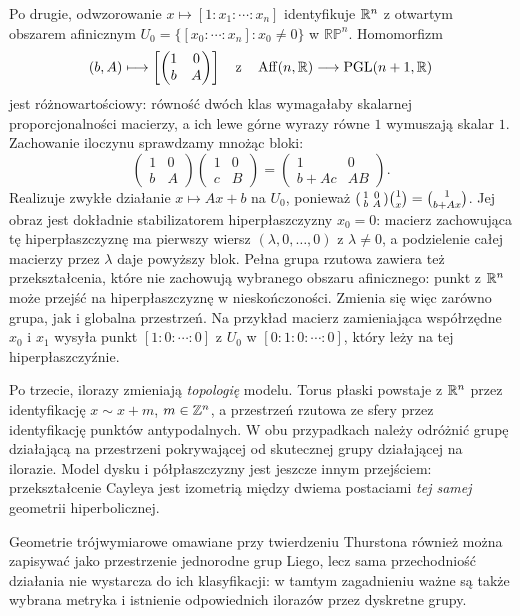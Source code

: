 Po drugie, odwzorowanie $x\mapsto[1:x_1:\cdots:x_n]$
identyfikuje $\mathbb{R}^n$ z otwartym obszarem afinicznym
$U_0=\{[x_0:\cdots:x_n]:x_0\ne0\}$ w $\mathbb{RP}^n$.
Homomorfizm
\[
 (b,A)\longmapsto
 \left[\begin{pmatrix}1&0\\b&A\end{pmatrix}\right]
 \quad\text{z}\quad
 \operatorname{Aff}(n,\mathbb{R})
 \longrightarrow\mathrm{PGL}(n+1,\mathbb{R})
\]
jest różnowartościowy: równość dwóch klas wymagałaby
skalarnej proporcjonalności macierzy, a ich lewe górne
wyrazy równe $1$ wymuszają skalar $1$.
Zachowanie iloczynu sprawdzamy mnożąc bloki:
\[
 \begin{pmatrix}1&0\\b&A\end{pmatrix}
 \begin{pmatrix}1&0\\c&B\end{pmatrix}
 =\begin{pmatrix}1&0\\b+Ac&AB\end{pmatrix}.
\]
Realizuje zwykłe działanie
$x\mapsto Ax+b$ na $U_0$, ponieważ
$\begin{psmallmatrix}1&0\\b&A\end{psmallmatrix}
\binom{1}{x}=\binom{1}{b+Ax}$.
Jej obraz jest dokładnie stabilizatorem hiperpłaszczyzny
$x_0=0$: macierz zachowująca tę hiperpłaszczyznę ma
pierwszy wiersz $(\lambda,0,\ldots,0)$ z $\lambda\ne0$,
a podzielenie całej macierzy przez $\lambda$ daje powyższy blok.
Pełna grupa rzutowa
zawiera też przekształcenia, które nie zachowują
wybranego obszaru afinicznego: punkt z $\mathbb{R}^n$ może przejść
na hiperpłaszczyznę w nieskończoności. Zmienia się więc
zarówno grupa, jak i globalna przestrzeń.
Na przykład macierz zamieniająca współrzędne $x_0$ i $x_1$
wysyła punkt $[1:0:\cdots:0]$ z $U_0$ w
$[0:1:0:\cdots:0]$, który leży na tej hiperpłaszczyźnie.

Po trzecie, ilorazy zmieniają \emph{topologię} modelu.
Torus płaski powstaje z $\mathbb{R}^n$ przez identyfikację
$x\sim x+m$, $m\in\mathbb{Z}^n$, a przestrzeń rzutowa ze
sfery przez identyfikację punktów antypodalnych.
W obu przypadkach należy odróżnić grupę działającą na
przestrzeni pokrywającej od skutecznej grupy działającej
na ilorazie. Model dysku i półpłaszczyzny jest jeszcze
innym przejściem: przekształcenie Cayleya jest
izometrią między dwiema postaciami \emph{tej samej}
geometrii hiperbolicznej.

Geometrie trójwymiarowe omawiane przy twierdzeniu
Thurstona również można zapisywać jako przestrzenie
jednorodne grup Liego, lecz sama przechodniość działania
nie wystarcza do ich klasyfikacji: w tamtym zagadnieniu
ważne są także wybrana metryka i istnienie odpowiednich
ilorazów przez dyskretne grupy.

